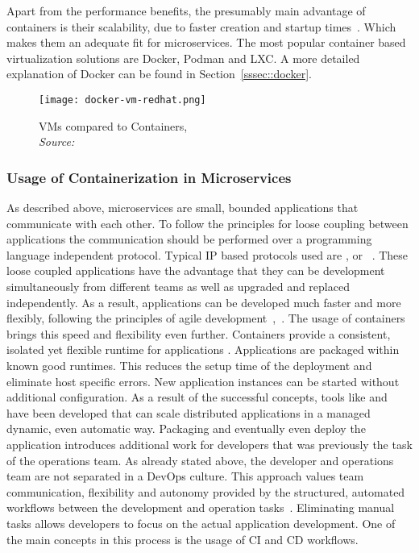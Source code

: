 \documentclass[12pt, a4paper]{article}
\begin{document}
        Apart from the performance benefits, the presumably main advantage of containers is their scalability, due to faster creation and startup times~\cite{cintainer_scale}. Which makes them an adequate fit for microservices. The most popular container based virtualization solutions are Docker, Podman and LXC. A more detailed explanation of Docker can be found in Section~\ref{sssec::docker}.

        \begin{figure}
            \centering
            \texttt{[image: docker-vm-redhat.png]}
            \caption{\ac{VM}s compared to Containers, \\\textit{Source:~\cite{redhat_pic}}}\label{fig::vm_docker}
        \end{figure}

        \subsubsection{Usage of Containerization in Microservices}
        As described above, microservices are small, bounded applications that communicate with each other. To follow the principles for loose coupling between applications the communication should be performed over a programming language independent protocol. Typical \acs{IP} based protocols used are ,  or ~\cite{micro}. These loose coupled applications have the advantage that they can be development simultaneously from different teams as well as upgraded and replaced independently. As a result, applications can be developed much faster and more flexibly, following the principles of agile development~\cite{micro},~\cite{redhat_micro}.\newline
        The usage of containers brings this speed and flexibility even further. Containers provide a consistent, isolated yet flexible runtime for applications \cite{micro_container}. Applications are packaged within known good runtimes. This reduces the setup time of the deployment and eliminate host specific errors. New application instances can be started without additional configuration. As a result of the successful concepts, tools like  and  have been developed that can scale distributed applications in a managed dynamic, even automatic way.\newline
        \noindent Packaging and eventually even deploy the application introduces additional work for developers that was previously the task of the operations team. As already stated above, the developer and operations team are not separated in a DevOps culture. This approach values team communication, flexibility and autonomy provided by the structured, automated workflows between the development and operation tasks~\cite{effective_devops}. Eliminating manual tasks allows developers to focus on the actual application development. One of the main concepts in this process is the usage of \ac{CI} and \ac{CD} workflows.
\end{document}
